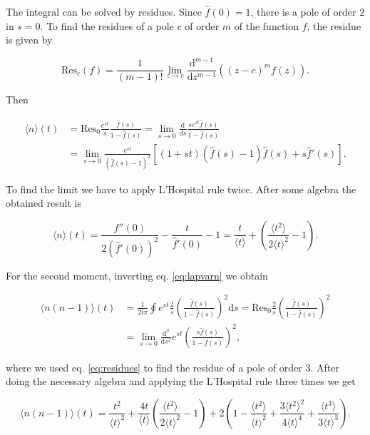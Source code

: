 The integral can be solved by residues. Since $\hat{f}(0)=1$, there is a pole of order $2$ in $s=0$. To find the residues of a pole $c$ of order $m$ of the function $f$, the residue is given by

\begin{equation}
  \label{eq:residues}
  \text{Res}_c(f)=\frac{1}{(m-1)!}\lim_{z\to c}\frac{\mathrm{d}^{m-1}}{\mathrm{d}z^{m-1}}((z-c)^mf(z)).
\end{equation}

Then

\begin{equation*}
  \begin{split}
    \langle n\rangle(t)&=\text{Res}_0\frac{e^{st}}{s}\frac{\hat{f}(s)}{1-\hat{f}(s)}=\lim_{s\to0}\frac{\mathrm{d}}{\mathrm{d}s}\frac{se^{st}\hat{f}(s)}{1-\hat{f}(s)}\\
    & = \lim_{s\to0}\frac{e^{st}}{(\hat{f}(s)-1)^2}\left[(1+st)(\hat{f}(s)-1)\hat{f}(s) + s\hat{f}'(s)\right].
  \end{split}
\end{equation*}

To find the limit we have to apply L'Hospital rule twice. After some algebra the obtained result is

\begin{equation}
  \label{eq:aven}
  \langle n\rangle(t)=\frac{\hat{f}''(0)}{2(\hat{f}'(0))^2}-\frac{t}{\hat{f}'(0)}-1=\frac{t}{\langle t\rangle}+\left(\frac{\langle t^2\rangle}{2\langle t\rangle^2}-1\right).
\end{equation}

For the second moment, inverting eq. \eqref{eq:lapvarn} we obtain

\begin{equation*}
  \begin{split}
    \langle n(n-1)\rangle(t)&=\frac{1}{2i\pi}\oint e^{st}\frac{2}{s}\left(\frac{\hat{f}(s)}{1-\hat{f}(s)}\right)^2\mathrm{d}s=\text{Res}_0\frac{2}{s}\left(\frac{\hat{f}(s)}{1-\hat{f}(s)}\right)^2\\
&=\lim_{s\to0}\frac{\mathrm{d}^2}{\mathrm{d}s^2}e^{st}\left(\frac{s\hat{f}(s)}{1-\hat{f}(s)}\right)^2,
  \end{split}
\end{equation*}

where we used eq. \eqref{eq:residues} to find the residue of a pole of order $3$. After doing the necessary algebra and applying the L'Hospital rule three times we get

\begin{equation*}
  \langle n(n-1)\rangle(t)=\frac{t^2}{\langle t\rangle^2}+\frac{4t}{\langle t\rangle}\left(\frac{\langle t^2\rangle}{2\langle t\rangle^2}-1\right)+2\left(1-\frac{\langle t^2\rangle}{\langle t\rangle^2}+\frac{3\langle t^2\rangle^2}{4\langle t\rangle^4}+\frac{\langle t^3\rangle}{3\langle t\rangle^3}\right).
\end{equation*}

